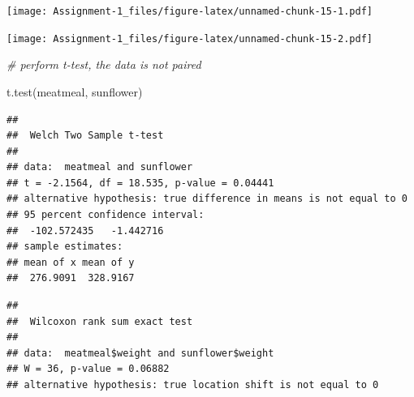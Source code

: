 \documentclass[
]{article}
\newenvironment{Shaded}{\begin{snugshade}}{\end{snugshade}}
\newcommand{\CommentTok}[1]{\textcolor[rgb]{0.56,0.35,0.01}{\textit{#1}}}
\newcommand{\FunctionTok}[1]{\textcolor[rgb]{0.00,0.00,0.00}{#1}}
\newcommand{\NormalTok}[1]{#1}
\newcommand{\SpecialCharTok}[1]{\textcolor[rgb]{0.00,0.00,0.00}{#1}}
\begin{document}
\texttt{[image: Assignment-1\_files/figure-latex/unnamed-chunk-15-1.pdf]}

\begin{Shaded}
\end{Shaded}

\texttt{[image: Assignment-1\_files/figure-latex/unnamed-chunk-15-2.pdf]}

\begin{Shaded}
\begin{Highlighting}[]
\CommentTok{\# perform t{-}test, the data is not paired}

\FunctionTok{t.test}\NormalTok{(meatmeal, sunflower)}
\end{Highlighting}
\end{Shaded}

\begin{verbatim}
## 
##  Welch Two Sample t-test
## 
## data:  meatmeal and sunflower
## t = -2.1564, df = 18.535, p-value = 0.04441
## alternative hypothesis: true difference in means is not equal to 0
## 95 percent confidence interval:
##  -102.572435   -1.442716
## sample estimates:
## mean of x mean of y 
##  276.9091  328.9167
\end{verbatim}

\begin{Shaded}
\end{Shaded}

\begin{verbatim}
## 
##  Wilcoxon rank sum exact test
## 
## data:  meatmeal$weight and sunflower$weight
## W = 36, p-value = 0.06882
## alternative hypothesis: true location shift is not equal to 0
\end{verbatim}

\begin{Shaded}
\end{Shaded}
\end{document}
